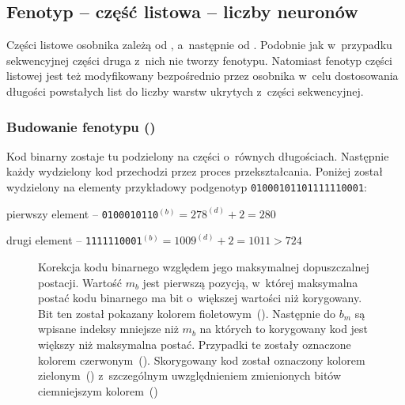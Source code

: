 \subsection{Fenotyp -- część listowa -- liczby neuronów}
\label{subsec:fenotype_list_nnum}
Części listowe osobnika zależą od
\textbf{},
a~następnie od \textbf{}.
Podobnie jak w~przypadku sekwencyjnej
części druga z~nich nie tworzy fenotypu.
Natomiast fenotyp części listowej jest
też modyfikowany bezpośrednio przez osobnika
w~celu dostosowania długości powstałych list
do liczby warstw ukrytych z~części sekwencyjnej.

\tocless\subsubsection{%
  Budowanie fenotypu
  ()%
}
Kod binarny zostaje tu podzielony
na części o~równych długościach.
Następnie każdy wydzielony kod przechodzi
przez proces przekształcania.
Poniżej został wydzielony na elementy
przykładowy podgenotyp \texttt{01000101101111110001}:
\begin{nospitemize}
  \item pierwszy element
    -- \texttt{0100010110}$\displaystyle
      {}^{\left(b\right)}
        =278^{\left(d\right)}+2
        =280
    $
  \item drugi element
    -- \texttt{1111110001}$\displaystyle
      {}^{\left(b\right)}
        =1009^{\left(d\right)}+2
        =1011 > 724
    $
\end{nospitemize}

\begin{figure}
  \centering
  
  \caption{
    Korekcja kodu binarnego względem
    jego maksymalnej dopuszczalnej postacji.
    Wartość $m_b$ jest pierwszą pozycją,
    w~której maksymalna postać kodu binarnego
    ma bit o~większej wartości niż korygowany.
    Bit ten został pokazany kolorem
    fioletowym~().
    Następnie do $b_m$ są wpisane indeksy mniejsze
    niż $m_b$ na których to korygowany kod
    jest większy niż maksymalna postać.
    Przypadki te zostały oznaczone
    kolorem czerwonym~().
    Skorygowany kod został oznaczony
    kolorem zielonym~()
    z~szczególnym uwzględnieniem zmienionych
    bitów ciemniejszym kolorem~()
  }
  \label{fig:bin_corr}
\end{figure}  

